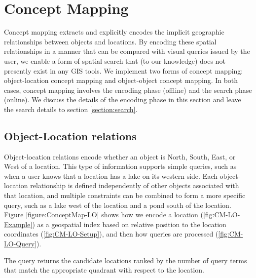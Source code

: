 \section{Concept Mapping}
\label{section:concept}

Concept mapping extracts and explicitly encodes the implicit geographic relationships between objects and locations. 
By encoding these spatial relationships in a manner that can be compared with visual queries issued by the user, we enable a form of spatial search that (to our knowledge) does not presently exist in any GIS tools.
We implement two forms of concept mapping: object-location concept mapping and object-object concept mapping.
In both cases, concept mapping involves the encoding phase (offline) and the search phase (online). 
We discuss the details of the encoding phase in this section and leave the search details to section \ref{section:search}.


\subsection{Object-Location relations}
Object-location relations encode whether an object is North, South, East, or West of a location. 
This type of information supports simple queries, such as when a user knows that a location has a lake on its western side. 
Each object-location relationship is defined independently of other objects associated with that location, and multiple constraints can be combined to form a more specific query, such as a lake west of the location and a pond south of the location.
Figure \ref{figure:ConceptMap-LO} shows how we encode a location (\ref{fig:CM-LO-Example}) as a geospatial index based on relative position to the location coordinates (\ref{fig:CM-LO-Setup}), and then how queries are processed (\ref{fig:CM-LO-Query}).

The query returns the candidate locations ranked by the number of query terms that match the appropriate quadrant with respect to the location.  

